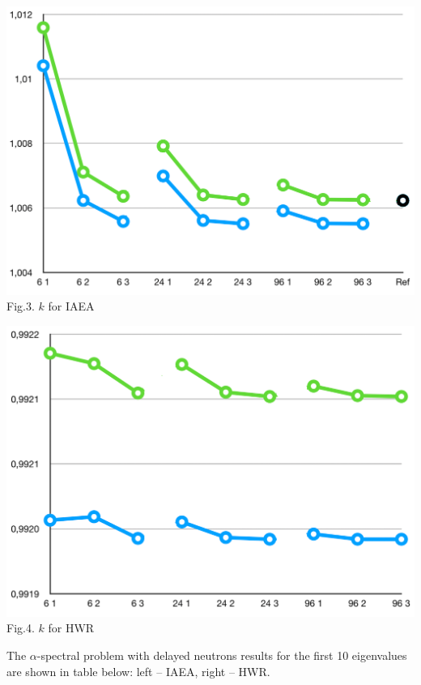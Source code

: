 \documentclass[a1paper,fontscale=0.6]{poster}
\begin{document}
\begin{poster}
{\begin{minipage}{0.5\textwidth}
\begin{center}
\includegraphics[width=0.7\linewidth]{spectral/iaea_k.png}\\
\vspace{-0em}
\footnotesize{Fig.3. $k$ for IAEA}
\end{center}
\end{minipage}
\begin{minipage}{0.5\textwidth}
\begin{center}
\includegraphics[width=0.7\linewidth]{spectral/hwr_k.png}\\
\vspace{-0.5em}
\footnotesize{Fig.4. $k$ for HWR}
\end{center}
\end{minipage}

\vspace{0.5em}
The $\alpha$-spectral problem with delayed neutrons results for the first 10 eigenvalues are shown in table below: left -- IAEA, right -- HWR.

}
\end{poster}
\end{document}
